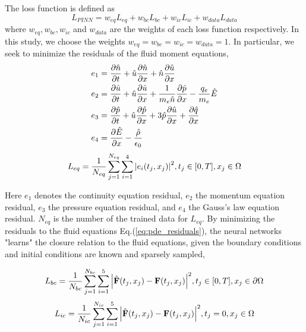 \documentclass{article}
\begin{document}
    The loss function is defined as
    \begin{equation} \label{eq:loss_funciton}
        L_{PINN} = w_{eq}L_{eq} + w_{bc}L_{bc} + w_{ic}L_{ic} + w_{data}L_{data}
    \end{equation}
    where $w_{eq}, w_{bc}, w_{ic}$ and $w_{data}$ are the weights of each loss function respectively. In this study, we choose the weights $w_{eq}=w_{bc}=w_{ic}=w_{data}=1$. In particular, we seek to minimize the residuals of the fluid moment equations, 
    \begin{equation} \label{eq:pde_residuals}
        \begin{aligned}
            e_1 &= \pdv{\hat{n}}{t} + \hat{u}\pdv{\hat{n}}{x} + \hat{n}\pdv{\hat{u}}{x} \\
            e_2 &= \pdv{\hat{u}}{t} + \hat{u}\pdv{\hat{u}}{x} + \frac{1}{m_e\hat{n}}\pdv{\hat{p}}{x} - \frac{q_e}{m_e}\hat{E} \\
            e_3 &= \pdv{\hat{p}}{t} + \hat{u}\pdv{\hat{p}}{x} + 3\hat{p}\pdv{\hat{u}}{x} + \pdv{\hat{q}}{x} \\
            e_4 &= \pdv{\hat{E}}{x} - \frac{\hat{\rho}}{\epsilon_0}
        \end{aligned}
    \end{equation}
    \begin{equation} \label{eq:loss_eq}
        L_{eq} = \frac{1}{N_{eq}} \sum_{j=1}^{N_{eq}}\sum_{i=1}^{4} \abs{e_i(t_j,x_j)}^2, t_j\in[0,T], x_j\in\Omega
    \end{equation}

    Here $e_1$ denotes the continuity equation residual, $e_2$ the momentum equation residual, $e_3$ the pressure equation residual, and $e_4$ the Gauss's law equation residual. $N_{eq}$ is the number of the trained data for $L_{eq}$. By minimizing the residuals to the fluid equations Eq.(\ref{eq:pde_residuals}), the neural networks "learns" the closure relation to the fluid equations, given the boundary conditions and initial conditions are known and sparsely sampled,

    \begin{equation} \label{eq:loss_bc}
        L_{bc} = \frac{1}{N_{bc}} \sum_{j=1}^{N_{bc}}\sum_{i=1}^{5} \abs{\hat{\mathbf{F}}(t_j,x_j)-\mathbf{F}(t_j,x_j)}^2, t_j\in[0,T], x_j\in\partial\Omega 
    \end{equation}
    \begin{equation} \label{eq:loss_ic}
        L_{ic} = \frac{1}{N_{ic}} \sum_{j=1}^{N_{ic}}\sum_{i=1}^{5} \abs{\hat{\mathbf{F}}(t_j,x_j)-\mathbf{F}(t_j,x_j)}^2, t_j=0, x_j\in\Omega
    \end{equation}
\end{document}
